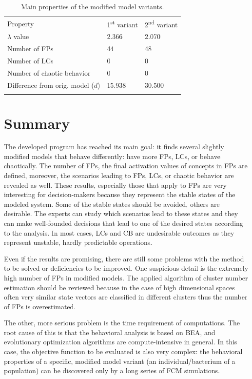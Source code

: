\documentclass[graybox]{svmult}
\begin{document}
\begin{table}
\caption{Main properties of the modified model variants.}
\label{tab:variantsProps}
\begin{center}
\begin{tabular}{lll}
\hline\noalign{\smallskip}
Property & 1\textsuperscript{st} variant & 2\textsuperscript{nd} variant\\
\noalign{\smallskip}\svhline\noalign{\smallskip}
$\lambda$ value & 2.366 & 2.070 \\
Number of FPs & 44 & 48 \\
Number of LCs & 0 & 0 \\
Number of chaotic behavior & 0 & 0 \\
Difference from orig. model ($d$) & 15.938 & 30.500 \\
\noalign{\smallskip}\hline
\end{tabular}
\end{center}
\end{table}

\section{Summary}
The developed program has reached its main goal: it finds several slightly modified models that behave differently: have more FPs, LCs, or behave chaotically. The number of FPs, the final activation values of concepts in FPs are defined, moreover, the scenarios leading to FPs, LCs, or chaotic behavior are revealed as well. These results, especially those that apply to FPs are very interesting for decision-makers because they represent the stable states of the modeled system. Some of the stable states should be avoided, others are desirable. The experts can study which scenarios lead to these states and they can make well-founded decisions that lead to one of the desired states according to the analysis. In most cases, LCs and CB are undesirable outcomes as they represent unstable, hardly predictable operations.

Even if the results are promising, there are still some problems with the method to be solved or deficiencies to be improved. One suspicious detail is the extremely high number of FPs in modified models. The applied algorithm of cluster number estimation should be reviewed because in the case of high dimensional spaces often very similar state vectors are classified in different clusters thus the number of FPs is overestimated.

The other, more serious problem is the time requirement of computations. The root cause of this is that the behavioral analysis is based on BEA, and evolutionary optimization algorithms are compute-intensive in general. In this case, the objective function to be evaluated is also very complex: the behavioral properties of a specific, modified model variant (an individual/bacterium of a population) can be discovered only by a long series of FCM simulations.
\end{document}
